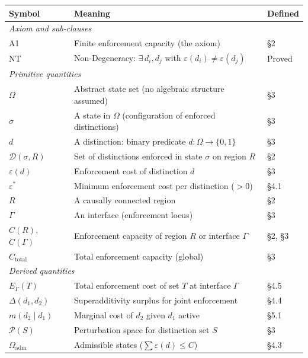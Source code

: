 \documentclass[11pt]{article}
\theoremstyle{remark}
\begin{document}
\begin{center}
\small
{}
\smallskip
\begin{tabular*}{\textwidth}{@{\extracolsep{\fill}}lll@{}}
\toprule
\textbf{Symbol} & \textbf{Meaning} & \textbf{Defined} \\
\midrule
\multicolumn{3}{l}{\textit{Axiom and sub-clauses}} \\[2pt]
A1 & Finite enforcement capacity (the axiom) & \S2 \\
NT & Non-Degeneracy: $\exists\,d_i,d_j$ with $\varepsilon(d_i)\ne\varepsilon(d_j)$ & Proved \\[4pt]
\multicolumn{3}{l}{\textit{Primitive quantities}} \\[2pt]
$\Omega$ & Abstract state set (no algebraic structure assumed) & \S3 \\
$\sigma$ & A state in $\Omega$ (configuration of enforced distinctions) & \S3 \\
$d$ & A distinction: binary predicate $d: \Omega \to \{0,1\}$ & \S3 \\
$\mathcal{D}(\sigma,R)$ & Set of distinctions enforced in state $\sigma$ on region $R$ & \S2 \\
$\varepsilon(d)$ & Enforcement cost of distinction $d$ & \S3 \\
$\varepsilon^*$ & Minimum enforcement cost per distinction ($>0$) & \S4.1 \\
$R$ & A causally connected region & \S2 \\
$\Gamma$ & An interface (enforcement locus) & \S3 \\
$C(R)$, $C(\Gamma)$ & Enforcement capacity of region $R$ or interface $\Gamma$ & \S2, \S3 \\
$C_{\mathrm{total}}$ & Total enforcement capacity (global) & \S3 \\[4pt]
\multicolumn{3}{l}{\textit{Derived quantities}} \\[2pt]
$E_\Gamma(T)$ & Total enforcement cost of set $T$ at interface $\Gamma$ & \S4.5 \\
$\Delta(d_1,d_2)$ & Superadditivity surplus for joint enforcement & \S4.4 \\
$m(d_2 \mid d_1)$ & Marginal cost of $d_2$ given $d_1$ active & \S5.1 \\
$\mathcal{P}(S)$ & Perturbation space for distinction set $S$ & \S3 \\
$\Omega_{\mathrm{adm}}$ & Admissible states ($\sum \varepsilon(d) \le C$) & \S4.3 \\[4pt]

\end{tabular*}
\end{center}
\end{document}
